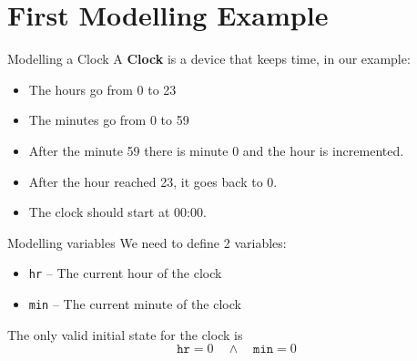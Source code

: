 \section[image=bgphoto_cut]{First Modelling Example}
\begin{frame}[plain]{}
    \sectionpage
\end{frame}

\begin{frame}{Modelling a Clock}
    A \textbf{Clock} is a device that keeps time, in our example:
    \begin{itemize}
        \item<1-> The hours go from 0 to 23
        \item<1-> The minutes go from 0 to 59
        \item<2-> After the minute 59 there is minute 0 and the hour is incremented.
        \item<2-> After the hour reached 23, it goes back to 0.
        \item<3-> The clock should start at 00:00.
    \end{itemize}
\end{frame}

\begin{frame}{Modelling variables}
    We need to define 2 variables:
    \pause
    \begin{itemize}[<+->]
        \item \texttt{hr} -- The current hour of the clock
        \item \texttt{min} -- The current minute of the clock\demo
    \end{itemize}
    \onslide<+->
    The only valid initial state for the clock is
    \[
        \texttt{hr} = 0 \quad \land \quad \texttt{min} = 0
    \]
    \demo
\end{frame}

